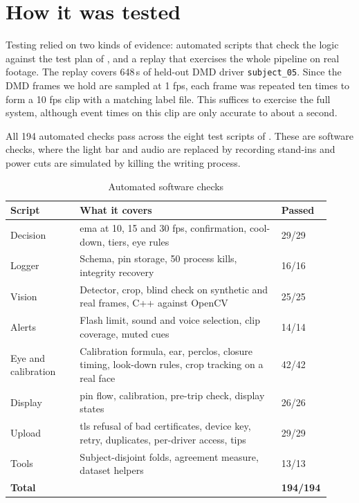 \section{How it was tested}

Testing relied on two kinds of evidence: automated scripts that check the logic against the test plan of , and a replay that exercises the whole pipeline on real footage. The replay covers 648\,s of held-out DMD driver \texttt{subject\_05}. Since the DMD frames we hold are sampled at 1 \gls{fps}, each frame was repeated ten times to form a 10 \gls{fps} clip with a matching label file. This suffices to exercise the full system, although event times on this clip are only accurate to about a second.

All 194 automated checks pass across the eight test scripts of . These are software checks, where the light bar and audio are replaced by recording stand-ins and power cuts are simulated by killing the writing process.

\begin{table}[htbp]
\centering
\caption{Automated software checks}
\label{tab:checks}
\footnotesize
\setlength{\tabcolsep}{3pt}
\renewcommand{\arraystretch}{1.15}
\begin{tabular}{|p{0.210\linewidth}|p{0.610\linewidth}|p{0.100\linewidth}|}
\hline
\textbf{Script} & \textbf{What it covers} & \textbf{Passed} \\
\hline
Decision & \gls{ema} at 10, 15 and 30 \gls{fps}, confirmation, cool-down, tiers, eye rules & 29/29 \\
\hline
Logger & Schema, \gls{pin} storage, 50 process kills, integrity recovery & 16/16 \\
\hline
Vision & Detector, crop, blind check on synthetic and real frames, C++ against OpenCV & 25/25 \\
\hline
Alerts & Flash limit, sound and voice selection, clip coverage, muted cues & 14/14 \\
\hline
Eye and calibration & Calibration formula, \gls{ear}, \gls{perclos}, closure timing, look-down rules, crop tracking on a real face & 42/42 \\
\hline
Display & \gls{pin} flow, calibration, pre-trip check, display states & 26/26 \\
\hline
Upload & \gls{tls} refusal of bad certificates, device key, retry, duplicates, per-driver access, tips & 29/29 \\
\hline
Tools & Subject-disjoint folds, agreement measure, dataset helpers & 13/13 \\
\hline
\textbf{Total} & & \textbf{194/194} \\
\hline
\end{tabular}
\end{table}

